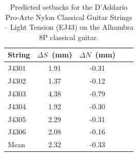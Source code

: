  \begin{table}[htbp]
  \centering
  \caption{\label{tbl:ej43_setbacks} Predicted setbacks for the D'Addario Pro-Arte Nylon Classical Guitar Strings -- Light Tension (EJ43) on the Alhambra 8P classical guitar.}
    \begin{tabular}{lcccc}
    \hline \hline
    String  & $\Delta S$~(mm) & $\Delta N$~(mm) \\
    \hline
    J4301 & 1.91 & -0.31 \\
    J4302 & 1.37 & -0.12 \\
    J4303 & 4.38 & -0.79 \\
    J4304 & 1.92 & -0.30 \\
    J4305 & 2.29 & -0.31 \\
    J4306 & 2.08 & -0.16 \\
    \hline \hline
    Mean & 2.32 & -0.33 \\
    \hline
    \end{tabular}%
 \end{table}%

